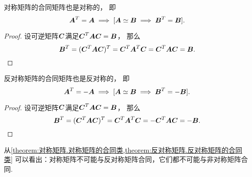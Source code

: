 \begin{proposition}\label{theorem:对称矩阵.对称矩阵的合同类}
对称矩阵的合同矩阵也是对称的，
即\begin{equation*}
	\boldsymbol{A}^T = \boldsymbol{A}
	\implies
	[\boldsymbol{A}\simeq\boldsymbol{B} \implies \boldsymbol{B}^T = \boldsymbol{B}].
\end{equation*}
\begin{proof}
设可逆矩阵\(\boldsymbol{C}\)满足\(\boldsymbol{C}^T\boldsymbol{A}\boldsymbol{C}=\boldsymbol{B}\)，
那么\begin{equation*}
	\boldsymbol{B}^T = (\boldsymbol{C}^T\boldsymbol{A}\boldsymbol{C})^T = \boldsymbol{C}^T\boldsymbol{A}^T\boldsymbol{C} = \boldsymbol{C}^T\boldsymbol{A}\boldsymbol{C} = \boldsymbol{B}.
	\qedhere
\end{equation*}
\end{proof}
\end{proposition}

\begin{proposition}\label{theorem:反对称矩阵.反对称矩阵的合同类}
反对称矩阵的合同矩阵也是反对称的，
即\begin{equation*}
	\boldsymbol{A}^T = -\boldsymbol{A}
	\implies
	[\boldsymbol{A}\simeq\boldsymbol{B} \implies \boldsymbol{B}^T = -\boldsymbol{B}].
\end{equation*}
\begin{proof}
设可逆矩阵\(\boldsymbol{C}\)满足\(\boldsymbol{C}^T\boldsymbol{A}\boldsymbol{C}=\boldsymbol{B}\)，
那么\begin{equation*}
	\boldsymbol{B}^T = (\boldsymbol{C}^T\boldsymbol{A}\boldsymbol{C})^T = \boldsymbol{C}^T\boldsymbol{A}^T\boldsymbol{C} = -\boldsymbol{C}^T\boldsymbol{A}\boldsymbol{C} = -\boldsymbol{B}.
	\qedhere
\end{equation*}
\end{proof}
\end{proposition}

\begin{remark}
从\cref{theorem:对称矩阵.对称矩阵的合同类,theorem:反对称矩阵.反对称矩阵的合同类}
可以看出：对称矩阵不可能与反对称矩阵合同，它们都不可能与非对称矩阵合同.
\end{remark}


